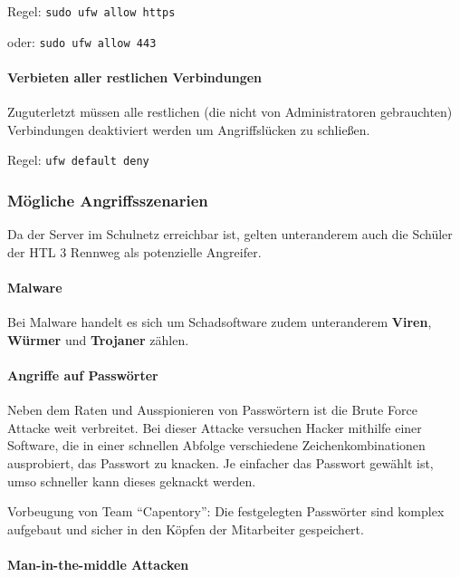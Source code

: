 Regel: \texttt{sudo\ ufw\ allow\ https}

oder: \texttt{sudo\ ufw\ allow\ 443}

\hypertarget{verbieten-aller-restlichen-verbindungen}{%
\paragraph{Verbieten aller restlichen
Verbindungen}\label{verbieten-aller-restlichen-verbindungen}}

Zuguterletzt müssen alle restlichen (die nicht von Administratoren
gebrauchten) Verbindungen deaktiviert werden um Angriffslücken zu
schließen.

Regel: \texttt{ufw\ default\ deny}

\hypertarget{muxf6gliche-angriffsszenarien}{%
\subsubsection{Mögliche
Angriffsszenarien}\label{muxf6gliche-angriffsszenarien}}

Da der Server im Schulnetz erreichbar ist, gelten unteranderem auch die
Schüler der HTL 3 Rennweg als potenzielle Angreifer.

\hypertarget{malware}{%
\paragraph{Malware}\label{malware}}

Bei Malware handelt es sich um Schadsoftware zudem unteranderem
\textbf{Viren}, \textbf{Würmer} und \textbf{Trojaner} zählen.

\hypertarget{angriffe-auf-passwuxf6rter}{%
\paragraph{Angriffe auf Passwörter}\label{angriffe-auf-passwuxf6rter}}

Neben dem Raten und Ausspionieren von Passwörtern ist die Brute Force
Attacke weit verbreitet. Bei dieser Attacke versuchen Hacker mithilfe
einer Software, die in einer schnellen Abfolge verschiedene
Zeichenkombinationen ausprobiert, das Passwort zu knacken. Je einfacher
das Passwort gewählt ist, umso schneller kann dieses geknackt werden.

Vorbeugung von Team ``Capentory'': Die festgelegten Passwörter sind
komplex aufgebaut und sicher in den Köpfen der Mitarbeiter gespeichert.

\hypertarget{man-in-the-middle-attacken}{%
\paragraph{Man-in-the-middle
Attacken}\label{man-in-the-middle-attacken}}

